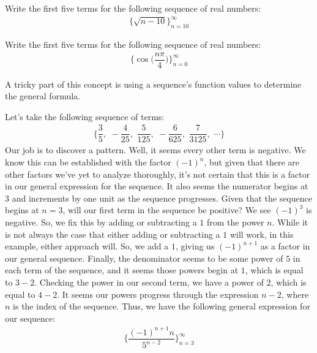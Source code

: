 \begin{exercise}
Write the first five terms for the following sequence of real numbers:
\begin{align*}
    \{\sqrt{n-10}\}_{n=10}^{\infty}
\end{align*}
\end{exercise}

\begin{exercise}
Write the first five terms for the following sequence of real numbers:
\begin{align*}
    \Big\{\cos{\Big(\dfrac{n\pi}{4}\Big)}\Big\}_{n=0}^{\infty}
\end{align*}
\end{exercise}

A tricky part of this concept is using a sequence's function values to determine the general formula.

\begin{example}
Let's take the following sequence of terms:
\begin{align*}
    \Big\{\dfrac{3}{5}, \hspace{4pt} -\dfrac{4}{25}, \hspace{4pt} \dfrac{5}{125}, \hspace{4pt} -\dfrac{6}{625}, \hspace{4pt} \dfrac{7}{3125}, \hspace{4pt} \cdots \Big\}
\end{align*}
Our job is to discover a pattern. Well, it seems every other term is negative. We know this can be established with the factor $(-1)^{n}$, but given that there are other factors we've yet to analyze thoroughly, it's not certain that this is a factor in our general expression for the sequence. It also seems the numerator begins at $3$ and increments by one unit as the sequence progresses. Given that the sequence begins at $n=3$, will our first term in the sequence be positive? We see $(-1)^{3}$ is negative. So, we fix this by adding or subtracting a $1$ from the power $n$. While it is not always the case that either adding or subtracting a $1$ will work, in this example, either approach will. So, we add a $1$, giving us $(-1)^{n+1}$ as a factor in our general sequence. Finally, the denominator seems to be some power of $5$ in each term of the sequence, and it seems those powers begin at $1$, which is equal to $3-2$. Checking the power in our second term, we have a power of $2$, which is equal to $4-2$. It seems our powers progress through the expression $n-2$, where $n$ is the index of the sequence. Thus, we have the following general expression for our sequence:
\begin{align*}
    \Big\{\dfrac{(-1)^{n+1}n}{5^{n-2}}\Big\}_{n=3}^{\infty}
\end{align*}
\end{example}

